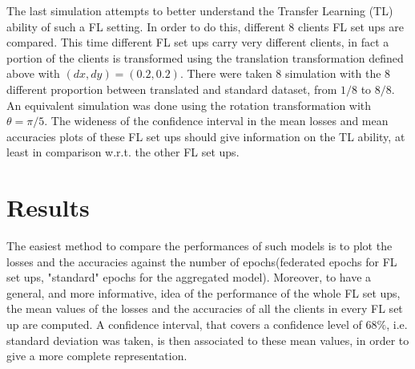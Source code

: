 \documentclass{article} %
\newcounter{other}
\newcounter{late}
\begin{document}
The last simulation attempts to better understand the Transfer Learning (TL) ability of such a FL setting.
In order to do this, different 8 clients FL set ups are compared.
This time different FL set ups carry very different clients, in fact a portion of the clients 
is transformed using the translation transformation defined above with $(dx, dy)=(0.2, 0.2)$.
There were taken 8 simulation with the 8 different proportion between translated and standard 
dataset, from $1/8$ to $8/8$.
An equivalent simulation was done using the rotation transformation with $\theta=\pi/5$.
The wideness of the confidence interval in the mean losses and mean accuracies 
plots of these FL set ups should give information on the TL ability, at least in 
comparison w.r.t. the other FL set ups.

\section {Results}
The easiest method to compare the performances of such models is to plot 
the losses and the accuracies against the number of epochs(federated epochs for FL set 
ups, "standard" epochs for the aggregated model).
Moreover, to have a general, and more informative, idea of the performance of the whole FL 
set ups, the mean values of the losses and the accuracies of all the clients in every FL 
set up are computed.
A confidence interval, that covers a confidence level of $68\%$, i.e. standard deviation
was taken, is then associated to these mean values, in order to give a more complete 
representation.
\end{document}
